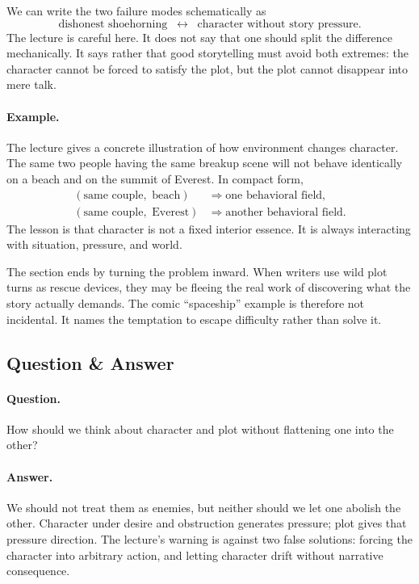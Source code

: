 We can write the two failure modes schematically as
\begin{equation}
\text{dishonest shoehorning} \;\;\leftrightarrow\;\; \text{character without story pressure}.
\end{equation}
The lecture is careful here. It does not say that one should split the difference mechanically. It says rather that good storytelling must avoid both extremes: the character cannot be forced to satisfy the plot, but the plot cannot disappear into mere talk.

\paragraph{Example.} The lecture gives a concrete illustration of how environment changes character. The same two people having the same breakup scene will not behave identically on a beach and on the summit of Everest. In compact form,
\begin{align}
(\text{same couple},\text{ beach}) &\Rightarrow \text{one behavioral field},\\
(\text{same couple},\text{ Everest}) &\Rightarrow \text{another behavioral field}.
\end{align}
The lesson is that character is not a fixed interior essence. It is always interacting with situation, pressure, and world.

The section ends by turning the problem inward. When writers use wild plot turns as rescue devices, they may be fleeing the real work of discovering what the story actually demands. The comic ``spaceship'' example is therefore not incidental. It names the temptation to escape difficulty rather than solve it.

\subsection{Question \& Answer}

\paragraph{Question.} How should we think about character and plot without flattening one into the other?

\paragraph{Answer.} We should not treat them as enemies, but neither should we let one abolish the other. Character under desire and obstruction generates pressure; plot gives that pressure direction. The lecture's warning is against two false solutions: forcing the character into arbitrary action, and letting character drift without narrative consequence.

